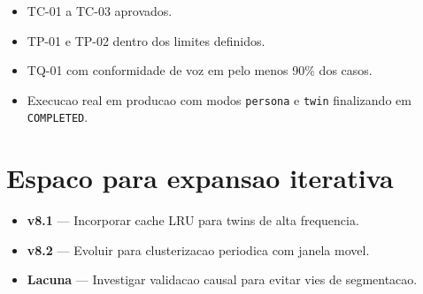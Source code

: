 \begin{itemize}[leftmargin=*]
  \item TC-01 a TC-03 aprovados.
  \item TP-01 e TP-02 dentro dos limites definidos.
  \item TQ-01 com conformidade de voz em pelo menos 90\% dos casos.
  \item Execucao real em producao com modos \texttt{persona} e \texttt{twin}
        finalizando em \texttt{COMPLETED}.
\end{itemize}

\section{Espaco para expansao iterativa}

\begin{itemize}[leftmargin=*]
  \item \textbf{v8.1} --- Incorporar cache LRU para twins de alta frequencia.
  \item \textbf{v8.2} --- Evoluir para clusterizacao periodica com janela movel.
  \item \textbf{Lacuna} --- Investigar validacao causal para evitar vies de segmentacao.
\end{itemize}
